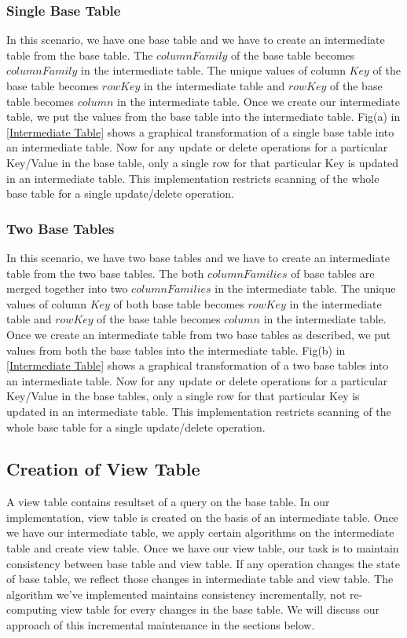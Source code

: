 \documentclass[11pt,a4paper,bibtotoc,idxtotoc,headsepline,footsepline,footexclude,BCOR12mm,DIV13]{scrbook}
\begin{document}
\subsubsection{Single Base Table}
\label{Single Base Table}
In this scenario, we have one base table and we have to create an intermediate table from the base table. The $columnFamily$ of the base table becomes $columnFamily$ in the intermediate table. The unique values of column $Key$ of the base table becomes $rowKey$ in the intermediate table and $rowKey$ of the base table becomes $column$ in the intermediate table. Once we create our intermediate table, we put the values from the base table into the intermediate table. Fig(a) in \ref{Intermediate Table} shows a graphical transformation of a single base table into an intermediate table. Now for any update or delete operations for a particular Key/Value in the base table, only a single row for that particular Key is updated in an intermediate table. This implementation restricts scanning of the whole base table for a single update/delete operation.

\subsubsection{Two Base Tables}
\label{Two Base Tables}
In this scenario, we have two base tables and we have to create an intermediate table from the two base tables. The both $columnFamilies$ of base tables are merged together into two $columnFamilies$ in the intermediate table. The unique values of column $Key$ of both base table becomes $rowKey$ in the intermediate table and $rowKey$ of the base table becomes $column$ in the intermediate table. Once we create an intermediate table from two base tables as described, we put values from both the base tables into the intermediate table. Fig(b) in \ref{Intermediate Table} shows a graphical transformation of a two base tables into an intermediate table. Now for any update or delete operations for a particular Key/Value in the base tables, only a single row for that particular Key is updated in an intermediate table. This implementation restricts scanning of the whole base table for a single update/delete operation.

\subsection{Creation of View Table}
A view table contains resultset of a query on the base table. In our implementation, view table is created on the basis of an intermediate table. Once we have our intermediate table, we apply certain algorithms on the intermediate table and create view table. Once we have our view table, our task is to maintain consistency between base table and view table. If any operation changes the state of base table, we reflect those changes in intermediate table and view table. The algorithm we've implemented maintains consistency incrementally, not re-computing view table for every changes in the base table. We will discuss our approach of this incremental maintenance in the sections below.
\end{document}
